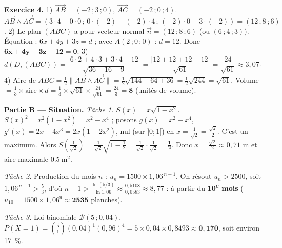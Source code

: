 \noindent\textbf{Exercice 4.}
1) $\vec{AB}=(-2\,;3\,;0)$, $\vec{AC}=(-2\,;0\,;4)$.
$\vec{AB}\wedge\vec{AC}=(3\cdot4-0\cdot0\,;\,0\cdot(-2)-(-2)\cdot4\,;\,(-2)\cdot0-3\cdot(-2))
=(12\,;8\,;6)$.
2) Le plan $(ABC)$ a pour vecteur normal $\vec n=(12\,;8\,;6)$ (ou $(6\,;4\,;3)$).
Équation : $6x+4y+3z=d$ ; avec $A(2\,;0\,;0)$ : $d=12$. Donc
$\mathbf{6x+4y+3z-12=0}$.
3) $d(D,(ABC))=\dfrac{|6\cdot2+4\cdot3+3\cdot4-12|}{\sqrt{36+16+9}}
=\dfrac{|12+12+12-12|}{\sqrt{61}}=\dfrac{24}{\sqrt{61}}\approx3{,}07$.
4) Aire de $ABC=\frac12\|\vec{AB}\wedge\vec{AC}\|=\frac12\sqrt{144+64+36}=\frac12\sqrt{244}
=\sqrt{61}$. Volume $=\frac13\times\text{aire}\times d=\frac13\times\sqrt{61}\times\frac{24}{\sqrt{61}}
=\frac{24}{3}=\mathbf{8}$ (unités de volume).

\smallskip
\noindent\textbf{Partie B — Situation.}
\emph{Tâche 1.} $S(x)=x\sqrt{1-x^2}$. $S(x)^2=x^2(1-x^2)=x^2-x^4$ ; posons
$g(x)=x^2-x^4$, $g'(x)=2x-4x^3=2x(1-2x^2)$, nul (sur $]0;1[$) en
$x=\frac{1}{\sqrt2}=\frac{\sqrt2}{2}$. C'est un maximum. Alors
$S\!\left(\tfrac{1}{\sqrt2}\right)=\tfrac{1}{\sqrt2}\sqrt{1-\tfrac12}=\tfrac{1}{\sqrt2}\cdot\tfrac{1}{\sqrt2}=\mathbf{\tfrac12}$.
Donc $x=\frac{\sqrt2}{2}\approx0{,}71$ m et aire maximale $\SI{0,5}{\metre\squared}$.

\emph{Tâche 2.} Production du mois $n$ : $u_n=1500\times1{,}06^{\,n-1}$. On résout
$u_n>2500$, soit $1{,}06^{\,n-1}>\frac{5}{3}$, d'où
$n-1>\frac{\ln(5/3)}{\ln1{,}06}\approx\frac{0{,}5108}{0{,}0583}\approx8{,}77$ : à partir du
\textbf{10\textsuperscript{e} mois} ($u_{10}=1500\times1{,}06^9\approx\mathbf{2535}$ planches).

\emph{Tâche 3.} Loi binomiale $\mathcal{B}(5\,;0{,}04)$.
$P(X{=}1)=\binom{5}{1}(0{,}04)^1(0{,}96)^4=5\times0{,}04\times0{,}8493\approx\mathbf{0{,}170}$,
soit environ \SI{17}{\percent}.
